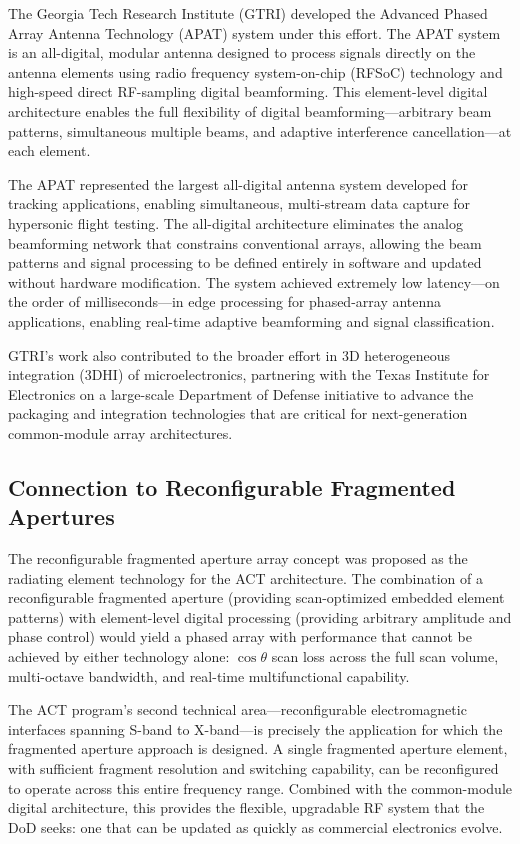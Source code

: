 The Georgia Tech Research Institute (GTRI) developed the Advanced Phased Array Antenna Technology (APAT) system under this effort.  The APAT system is an all-digital, modular antenna designed to process signals directly on the antenna elements using radio frequency system-on-chip (RFSoC) technology and high-speed direct RF-sampling digital beamforming.  This element-level digital architecture enables the full flexibility of digital beamforming---arbitrary beam patterns, simultaneous multiple beams, and adaptive interference cancellation---at each element.

The APAT represented the largest all-digital antenna system developed for tracking applications, enabling simultaneous, multi-stream data capture for hypersonic flight testing.  The all-digital architecture eliminates the analog beamforming network that constrains conventional arrays, allowing the beam patterns and signal processing to be defined entirely in software and updated without hardware modification.  The system achieved extremely low latency---on the order of milliseconds---in edge processing for phased-array antenna applications, enabling real-time adaptive beamforming and signal classification.

GTRI's work also contributed to the broader effort in 3D heterogeneous integration (3DHI) of microelectronics, partnering with the Texas Institute for Electronics on a large-scale Department of Defense initiative to advance the packaging and integration technologies that are critical for next-generation common-module array architectures.

\subsection{Connection to Reconfigurable Fragmented Apertures}

The reconfigurable fragmented aperture array concept was proposed as the radiating element technology for the ACT architecture.  The combination of a reconfigurable fragmented aperture (providing scan-optimized embedded element patterns) with element-level digital processing (providing arbitrary amplitude and phase control) would yield a phased array with performance that cannot be achieved by either technology alone: $\cos\theta$ scan loss across the full scan volume, multi-octave bandwidth, and real-time multifunctional capability.

The ACT program's second technical area---reconfigurable electromagnetic interfaces spanning S-band to X-band---is precisely the application for which the fragmented aperture approach is designed.  A single fragmented aperture element, with sufficient fragment resolution and switching capability, can be reconfigured to operate across this entire frequency range.  Combined with the common-module digital architecture, this provides the flexible, upgradable RF system that the DoD seeks: one that can be updated as quickly as commercial electronics evolve.

